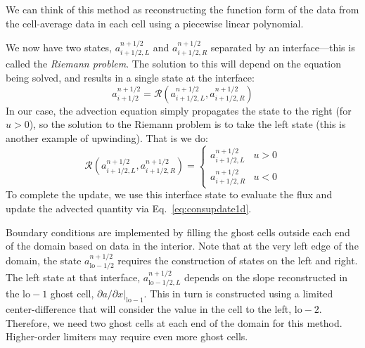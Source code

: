 \documentclass[11pt]{article}
\begin{document}
We can think of this method as reconstructing the function form of the
data from the cell-average data in each cell using  a piecewise linear
polynomial. 

We now have two states, $a_{i+1/2,L}^{n+1/2}$ and
$a_{i+1/2,R}^{n+1/2}$ separated by an interface---this is called the
{\em Riemann problem}.
%
The solution to this will depend on the equation being solved, and
results in a single state at the interface:
\begin{equation}
a_{i+1/2}^{n+1/2} = \mathcal{R}(a_{i+1/2,L}^{n+1/2},a_{i+1/2,R}^{n+1/2})
\end{equation}
In our case, the advection equation simply propagates the state to the
right (for $u > 0$), so the solution to the Riemann problem is to take
the left state (this is another example of upwinding).  That is we do:
\begin{equation}
\mathcal{R}(a_{i+1/2,L}^{n+1/2},a_{i+1/2,R}^{n+1/2}) = \left \{ \begin{array}{ccc} a_{i+1/2,L}^{n+1/2} & u > 0 \\[2mm] a_{i+1/2,R}^{n+1/2} & u < 0 \end{array} \right .
\label{eq:riemannsolve}
\end{equation}
To complete the update, we use this interface state to evaluate the flux
and update the advected quantity via Eq.~\ref{eq:consupdate1d}.

Boundary conditions are implemented by filling the ghost cells outside
each end of the domain based on data in the interior.  Note that at
the very left edge of the domain, the state
$a^{n+1/2}_{\mathrm{lo}-1/2}$ requires the construction of states on
the left and right.  The left state at that interface,
$a^{n+1/2}_{\mathrm{lo}-1/2,L}$ depends on the slope reconstructed in
the $\mathrm{lo}-1$ ghost cell, $\partial a/\partial x
|_{\mathrm{lo}-1}$.  This in turn is constructed using a limited
center-difference that will consider the value in the cell to the
left, $\mathrm{lo-2}$.  Therefore, we need two ghost cells at each end
of the domain for this method.  Higher-order limiters may require even
more ghost cells.
\end{document}
